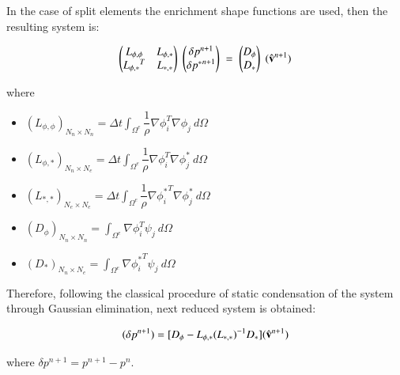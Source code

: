 In the case of split elements the enrichment shape functions are used, then the resulting system is:

  \begin{equation*}
   \begin{pmatrix}
      L_{\phi,\phi} & L_{\phi,*}\\
      {L_{\phi,*}}^T & L_{*,*}
   \end{pmatrix}\;
    \begin{pmatrix}
      \delta p^{n+1}\\
      \delta {p^*}^{n+1}
   \end{pmatrix}\; = \;
   \begin{pmatrix}
      D_{\phi}\\
      D_*
   \end{pmatrix}\;
   (\hat{\mathbf{v}}^{n+1})
   \label{poisson}
\end{equation*}

where
\begin{itemize}
 \item ${(L_{\phi,\phi})}_{N_n\times N_n} = \Delta t \int_{\Omega^e} \dfrac{1}{\rho} \nabla \phi_i^T \nabla \phi_j \ d\Omega$
 \item ${(L_{\phi,*})}_{N_n\times N_e} = \Delta t \int_{\Omega^e} \dfrac{1}{\rho} \nabla \phi_i^T \nabla \phi_j^* \ d\Omega$
 \item ${(L_{*,*})}_{N_e\times N_e} = \Delta t \int_{\Omega^e} \dfrac{1}{\rho} \nabla {\phi_i^*}^T \nabla \phi_j^* \ d\Omega$
 \item ${(D_{\phi})}_{N_n\times N_n} = \int_{\Omega^e} \nabla \phi_i^T \psi_j \ d\Omega$
 \item ${(D_*)}_{N_n\times N_e} = \int_{\Omega^e}  \nabla {\phi_i^*}^T \psi_j \ d\Omega$
\end{itemize}

Therefore, following the classical procedure of static condensation of the system through Gaussian elimination\cite{Felippa04}, next reduced system is obtained:

  \begin{equation}
   [L_{\phi,\phi} - L_{\phi,*}{(L_{*,*})}^{-1}{L_{\phi,*}}^T](\delta p^{n+1}) = [D_{\phi}- L_{\phi,*}{(L_{*,*})}^{-1}D_{*}](\hat{\vv}^{n+1})
   \label{condensing}
  \end{equation}
  
  where $\delta p^{n+1} = p^{n+1}-p^{n}$.

% 

